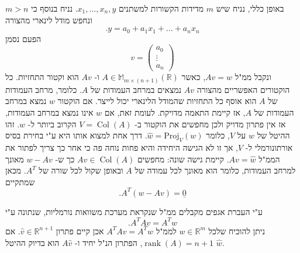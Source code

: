 \documentclass[12pt]{report}
\theoremstyle{plain}
\theoremstyle{definition}
\newcommand{\R}{\mathbb{R}}
\DeclareMathOperator{\rank}{rank}
\newcommand{\M}{\mathbb{M}}
\newcommand{\0}{\mathbf{0}}
\DeclareMathOperator{\Col}{Col}
\begin{document}
באופן כללי, נניח שיש 
$m$
מדידות הקשורות למשתנים
$x_1,...,x_n,y$. 
נניח בנוסף כי
$m>n$
ונחפש מודל לינארי מהצורה
$$
.y=a_0+a_1x_1+...+a_nx_n
$$
הפעם נסמן
$$
v=\begin{pmatrix}a_0\\\vdots\\a_n\end{pmatrix}
$$
ונקבל ממ"ל
$Av=w$,
כאשר
$A\in\M_{m\times (n+1)}(\R)$
ו-
$Av$
הוא וקטור התחזיות.
כל הוקטורים האפשריים מהצורה
$Av$
נמצאים במרחב העמודות של
$A$.
כלומר, מרחב העמודות של
$A$
הוא אוסף כל התחזיות שהמודל הלינארי יכול לייצר.
אם הוקטור
$w$
נמצא במרחב העמודות של
$A$,
אז קיימת התאמה מדויקת. לעומת זאת, אם
$w$
אינו נמצא במרחב העמודות, אז אין פתרון מדויק ולכן מחפשים את הוקטור ב-
$V=\Col(A)$
הקרוב ביותר ל-
$w$.
זהו ההיטל של
$w$
על
$V$,
כלומר
$\hat{w}=\text{Proj}_V(w)$.
דרך אחת למצוא אותו היא ע"י בחירת בסיס אורתונורמלי ל-
$V$,
אך זו לא הגישה היחידה והיא פחות נוחה פה כי אחר כך צריך לפתור את הממ"ל
$Av=\hat{w}$.
קיימת גישה שונה: מחפשים
$Av\in\Col(A)$
כך ש-
$w-Av$
מאונך למרחב העמודות, כלומר הוא מאונך לכל עמודה של
$A$
ובאופן שקול לכל שורה של
$A^T$.
מכאן שמתקיים
$$
.A^T(w-Av)=\underline{0}
$$

ע"י העברת אגפים מקבלים ממ"ל שנקראת מערכת משוואות נורמליות, שנתונה ע"י
\begin{equation}\label{eq:normal}
.A^TAv=A^Tw
\end{equation}
ניתן להוכיח שלכל 
$w\in\R^m$
לממ"ל
$A^TAv=A^Tw$
אכן קיים פתרון 
$\hat{v}\in\R^{n+1}$.
אם
$\rank(A)=n+1$,
הפתרון הנ"ל יחיד ו-
$A\hat{v}$
הוא בדיוק ההיטל 
$\hat{w}$.
\end{document}
